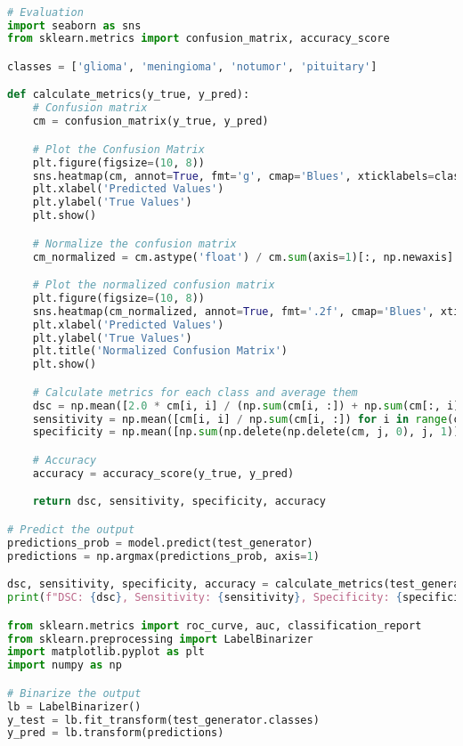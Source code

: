\begin{lstlisting}[language=Python]

# Evaluation
import seaborn as sns
from sklearn.metrics import confusion_matrix, accuracy_score

classes = ['glioma', 'meningioma', 'notumor', 'pituitary']

def calculate_metrics(y_true, y_pred):
    # Confusion matrix
    cm = confusion_matrix(y_true, y_pred)

    # Plot the Confusion Matrix
    plt.figure(figsize=(10, 8))
    sns.heatmap(cm, annot=True, fmt='g', cmap='Blues', xticklabels=classes, yticklabels=classes)
    plt.xlabel('Predicted Values')
    plt.ylabel('True Values')
    plt.show()

    # Normalize the confusion matrix
    cm_normalized = cm.astype('float') / cm.sum(axis=1)[:, np.newaxis]

    # Plot the normalized confusion matrix
    plt.figure(figsize=(10, 8))
    sns.heatmap(cm_normalized, annot=True, fmt='.2f', cmap='Blues', xticklabels=classes, yticklabels=classes)
    plt.xlabel('Predicted Values')
    plt.ylabel('True Values')
    plt.title('Normalized Confusion Matrix')
    plt.show()

    # Calculate metrics for each class and average them
    dsc = np.mean([2.0 * cm[i, i] / (np.sum(cm[i, :]) + np.sum(cm[:, i])) for i in range(cm.shape[0])])
    sensitivity = np.mean([cm[i, i] / np.sum(cm[i, :]) for i in range(cm.shape[0])])
    specificity = np.mean([np.sum(np.delete(np.delete(cm, j, 0), j, 1)) / np.sum(np.delete(cm, j, 0)) for j in range(cm.shape[0])])

    # Accuracy
    accuracy = accuracy_score(y_true, y_pred)

    return dsc, sensitivity, specificity, accuracy

# Predict the output
predictions_prob = model.predict(test_generator)
predictions = np.argmax(predictions_prob, axis=1)

dsc, sensitivity, specificity, accuracy = calculate_metrics(test_generator.classes, predictions)
print(f"DSC: {dsc}, Sensitivity: {sensitivity}, Specificity: {specificity}, Accuracy: {accuracy}")

from sklearn.metrics import roc_curve, auc, classification_report
from sklearn.preprocessing import LabelBinarizer
import matplotlib.pyplot as plt
import numpy as np

# Binarize the output
lb = LabelBinarizer()
y_test = lb.fit_transform(test_generator.classes)
y_pred = lb.transform(predictions)


\end{lstlisting}
